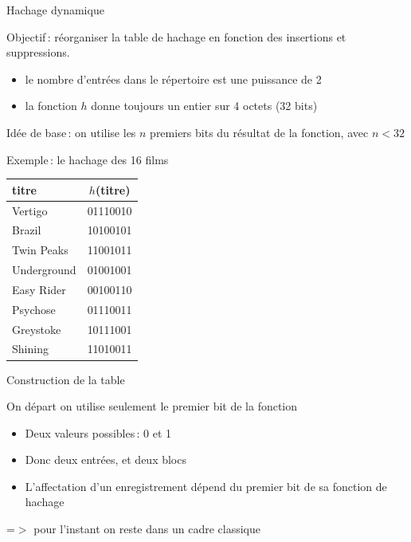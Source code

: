 \begin{frame}{Hachage dynamique}

Objectif\,: réorganiser la table de hachage en fonction
des insertions et suppressions. 

\begin{itemize}
  \item le nombre d'entrées dans le répertoire est une puissance
          de 2
  \item la fonction $h$ donne toujours un entier sur 4 octets (32 bits)  
\end{itemize}
Idée de base\,: 
 on utilise les $n$ premiers bits du résultat de la fonction, avec
$n < 32$

\end{frame}
\begin{frame}{Exemple\,: le hachage des 16 films}

\begin{center}
\begin{tabular}{l|c}
titre & $h$(titre)   \\
\hline
Vertigo     & 01110010  \\
Brazil      & 10100101  \\
Twin Peaks  & 11001011  \\
Underground & 01001001  \\
Easy Rider  & 00100110 \\
Psychose    &  01110011 \\
Greystoke   &  10111001 \\
Shining     &  11010011 \\
\hline
\end{tabular}
\end{center}

\end{frame}
\begin{frame}{Construction de la table}

On départ on utilise seulement le premier bit
de la fonction
\begin{itemize}
  \item Deux valeurs possibles\,: 0 et 1
  \item Donc deux entrées, et deux blocs
  \item L'affectation d'un enregistrement dépend
        du premier bit de sa fonction de hachage  
\end{itemize}

=$>$ pour l'instant on reste dans un cadre classique

\end{frame}
